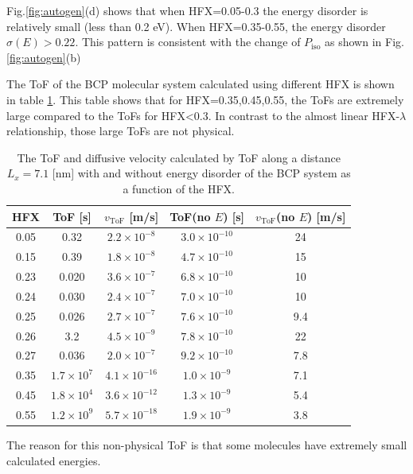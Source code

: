 \documentclass[letterpaper,12pt]{article}
\begin{document}
Fig.\ref{fig:autogen}(d) shows that when HFX=0.05-0.3 the energy disorder is relatively small (less than 0.2 eV). When HFX=0.35-0.55, the energy disorder $\sigma(E)>0.22$. This pattern is consistent with the change of $P_\text{iso}$ as shown in Fig. \ref{fig:autogen}(b)

The ToF of the BCP molecular system calculated using different HFX is shown in table \ref{tab:ToF_BCP_HFX}. This table shows that for HFX=0.35,0.45,0.55, the ToFs are extremely large compared to the ToFs for HFX<0.3. 
In contrast to the almost linear HFX-$\lambda$ relationship, those large ToFs are not physical. 


\begin{table}[H]
    \centering
    \begin{tabular}{c c c c c}
    \hline
        HFX & ToF [s] & $v_\text{ToF}$ [m/s] & ToF(no $E$) [s] & $v_\text{ToF}$(no $E$) [m/s] \\
    \hline
        0.05 & 0.32 & $2.2 \times 10^{-8}$ & $3.0 \times 10^{-10}$ & 24 \\
        0.15 & 0.39 & $1.8 \times 10^{-8}$ & $4.7 \times 10^{-10}$ & 15 \\
        0.23 & 0.020 & $3.6 \times 10^{-7}$ & $6.8 \times 10^{-10} $ & 10 \\
        0.24 & 0.030 & $2.4 \times 10^{-7}$ & $7.0 \times 10^{-10} $ & 10 \\
        0.25 & 0.026 & $2.7 \times 10^{-7}$ & $7.6 \times 10^{-10}$ & 9.4 \\
        0.26 & 3.2 & $4.5 \times 10^{-9}$ & $7.8 \times 10^{-10}$ & 22 \\
        0.27 & 0.036 & $2.0 \times 10^{-7}$ & $9.2 \times 10^{-10}$ & 7.8 \\
        0.35 & $1.7 \times 10^7 $ & $4.1 \times 10^{-16}$ & $1.0 \times 10^{-9}$ & 7.1 \\
        0.45 & $1.8 \times 10^4$ & $3.6 \times 10^{-12}$ & $1.3 \times 10^{-9}$ & 5.4\\
        0.55 & $1.2 \times 10^9 $ & $5.7 \times 10^{-18}$ & $1.9 \times 10^{-9} $ & 3.8 \\
    \hline
    \end{tabular}
    \caption{The ToF and diffusive velocity calculated by ToF along a distance $L_x = 7.1$ [nm] with and without energy disorder of the BCP system as a function of the HFX. }
    \label{tab:ToF_BCP_HFX}
\end{table}

The reason for this non-physical ToF is that some molecules have extremely small calculated energies. 
\end{document}
